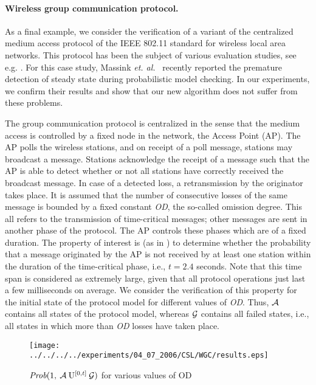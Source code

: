 \documentclass{entcs}
\begin{document}
	\paragraph{Wireless group communication protocol.}
		As a final example, we consider the verification of a variant of the centralized medium access protocol of the IEEE 802.11 standard for wireless local area networks.  This protocol has been the subject of various evaluation studies, see e.g. \cite{BondavalliCG_KAPCDC02,MockNS_EDCC00}.  For this case study, Massink \emph{et. al.}~\cite{MassinkKL_DSN04} recently reported the premature detection of steady state during probabilistic model checking.  In our experiments, we confirm their results and show that our new algorithm does not suffer from these problems.

		The group communication protocol is centralized in the sense that the medium access is controlled by a fixed node in the network, the Access Point (AP).  The AP polls the wireless stations, and on receipt of a poll message, stations may broadcast a message.  Stations acknowledge the receipt of a message such that the AP is able to detect whether or not all stations have correctly received the broadcast message.  In case of a detected loss, a retransmission by the originator takes place.  It is assumed that the number of consecutive losses of the same message is bounded by a fixed constant {\it OD}, the so-called omission degree.   This all refers to the transmission of time-critical messages; other messages are sent in another phase of the protocol.  The AP controls these phases which are of a fixed duration.  The property of interest is (as in \cite{BondavalliCG_KAPCDC02,MassinkKL_DSN04}) to determine whether the probability that a message originated by the AP is not received by at least one station within the duration of the time-critical phase, i.e., $t=2.4$ seconds.   Note that this time span is considered as extremely large, given that all protocol operations just last a few milliseconds on average.   We consider the verification of this property for the initial state of the protocol model for different values of {\it OD}.    Thus, $\mathcal{A}$ contains all states of the protocol model, whereas $\mathcal{G}$ contains all failed states, i.e., all states in which more than {\it OD} losses have taken place.

		\begin{figure}[h]
			\begin{center}
				\texttt{[image: ../../../../experiments/04\_07\_2006/CSL/WGC/results.eps]}
				\caption{{\small $\mbox{\it Prob}(1, \: \mathcal{A} \: \mathrm{U}^{[0,t]} \: \mathcal{G} )$ for various values of OD \label{gr:prob_6}}}
			\end{center}
		\end{figure}
\end{document}
